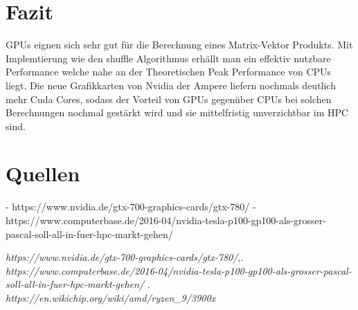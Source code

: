 \documentclass[10pt,a4paper]{article}
\begin{document}
	   \section{Fazit}
	   GPUs eignen sich sehr gut für die Berechnung eines Matrix-Vektor Produkts. Mit Implemtierung wie den shuffle Algorithmus erhällt man ein effektiv nutzbare Performance welche nahe an der Theoretischen Peak Performance von CPUs liegt. Die neue Grafikkarten von Nvidia der Ampere liefern nochmals deutlich mehr Cuda Cores, sodass der Vorteil von GPUs gegenüber CPUs bei solchen Berechnungen nochmal gestärkt wird und sie mittelfristig unverzichtbar im HPC sind.  	     
	 \section{Quellen} 
	 - https://www.nvidia.de/gtx-700-graphics-cards/gtx-780/
	 -https://www.computerbase.de/2016-04/nvidia-tesla-p100-gp100-als-grosser-pascal-soll-all-in-fuer-hpc-markt-gehen/
	\newpage
	\begin{thebibliography}{2}
		 \textit{https://www.nvidia.de/gtx-700-graphics-cards/gtx-780/},.
		\textit{ https://www.computerbase.de/2016-04/nvidia-tesla-p100-gp100-als-grosser-pascal-soll-all-in-fuer-hpc-markt-gehen/} \label{P100 Performance}.
		 \textit{https://en.wikichip.org/wiki/amd/ryzen\_9/3900x}
	\end{thebibliography}
\end{document}

